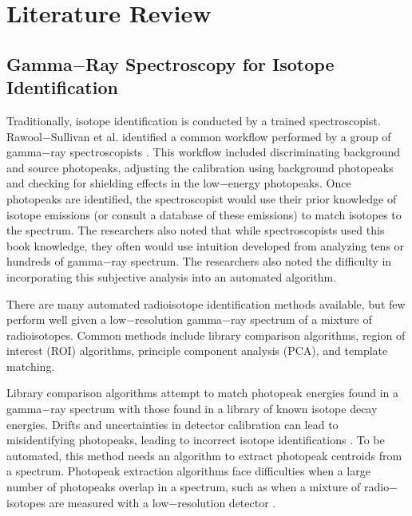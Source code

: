 \documentclass[tocnosub,noragright,centerchapter,12pt,fullpage]{uiucecethesis09}
\begin{document}









\chapter{Literature Review}


\section{Gamma$-$Ray Spectroscopy for Isotope Identification}

Traditionally, isotope identification is conducted by a trained spectroscopist. Rawool$-$Sullivan et al. identified a common workflow performed by a group of gamma$-$ray spectroscopists \cite{Sullivan2010}. This workflow included discriminating background and source photopeaks, adjusting the calibration using background photopeaks and checking for shielding effects in the low$-$energy photopeaks. Once photopeaks are identified, the spectroscopist would use their prior knowledge of isotope emissions (or consult a database of these emissions) to match isotopes to the spectrum. The researchers also noted that while  spectroscopists used this book knowledge, they often would use intuition developed from analyzing tens or hundreds of gamma$-$ray spectrum. The researchers also noted the difficulty in incorporating this subjective analysis into an automated algorithm.


There are many automated radioisotope identification methods available, but few perform well given a low$-$resolution gamma$-$ray spectrum of a mixture of radioisotopes. Common methods include library comparison algorithms, region of interest (ROI) algorithms, principle component analysis (PCA), and template matching.

Library comparison algorithms attempt to match photopeak energies found in a gamma$-$ray spectrum with those found in a library of known isotope decay energies. Drifts and uncertainties in detector calibration can lead to misidentifying photopeaks, leading to incorrect isotope identifications \cite{burr2009}. To be automated, this method needs an algorithm to extract photopeak centroids from a spectrum. Photopeak extraction algorithms face difficulties when a large number of photopeaks overlap in a spectrum, such as when a mixture of radio$-$isotopes are measured with a low$-$resolution detector \cite{xiong2015}.
\end{document}
